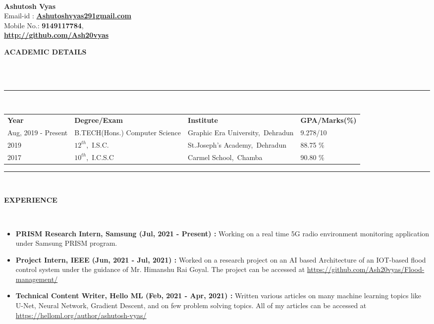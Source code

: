 \documentclass[a4paper,10pt]{article}
\newcommand{\lsep}{-0.5cm}
\newcommand{\resheading}[1]{{\small \colorbox{mygrey}{\begin{minipage}{0.975\textwidth}{\textbf{#1 \vphantom{p\^{E}}}}\end{minipage}}}}
\begin{document}
\hspace{0.5cm}\\[-0.2cm]

\textbf{Ashutosh Vyas} \\
\indent Email-id : \textbf{\url{Ashutoshvyas291gmail.com}} \\
\indent Mobile No.: \textbf{9149117784}, \ \\
\indent \textbf{\url{http://github.com/Ash20vyas}}\\

\resheading{\textbf{ACADEMIC DETAILS} }\\[\lsep]
\\
\indent \rule{6.8in}{0.4pt}\\
\indent \begin{tabular}{ l @{\hskip 0.15in} l @{\hskip 0.15in} l @{\hskip 0.15in} l @{\hskip 0.15in} }
\noindent \textbf{Year} & \textbf{Degree/Exam} & \textbf{Institute} & \textbf{GPA/Marks(\%)}\\
Aug, 2019 - Present & B.TECH(Hons.) Computer Science & Graphic Era University,\ Dehradun & 9.278/10 \\
2019 & $12^{th}$,\ I.S.C. & St.Joseph's Academy,\ Dehradun & 88.75 \% \\
2017 & $10^{th}$,\ I.C.S.C & Carmel School,\ Chamba & 90.80 \%\\

\end{tabular}
\indent \rule{6.8in}{0.4pt}
\\

\resheading{\textbf{EXPERIENCE} }\\[\lsep]
\begin{itemize}
\setlength\itemsep{0.5em}
\item \textbf{PRISM Research Intern, Samsung (Jul, 2021 - Present) : }
Working on a real time 5G radio environment monitoring application under Samsung PRISM program.
\item \textbf{Project Intern, IEEE (Jun, 2021 - Jul, 2021) : }
Worked on a research project on an AI based Architecture of an IOT-based flood control system under the guidance of Mr. Himanshu Rai Goyal.
The project can be accessed at \url{https://github.com/Ash20vyas/Flood-management/}
\item \textbf{Technical Content Writer, Hello ML (Feb, 2021 - Apr, 2021) : }Written various articles on many machine learning topics like U-Net,  Neural Network, Gradient Descent, and on few problem solving topics.
All of my articles can be accessed at \url{https://helloml.org/author/ashutosh-vyas/}
\end{itemize}
\end{document}
